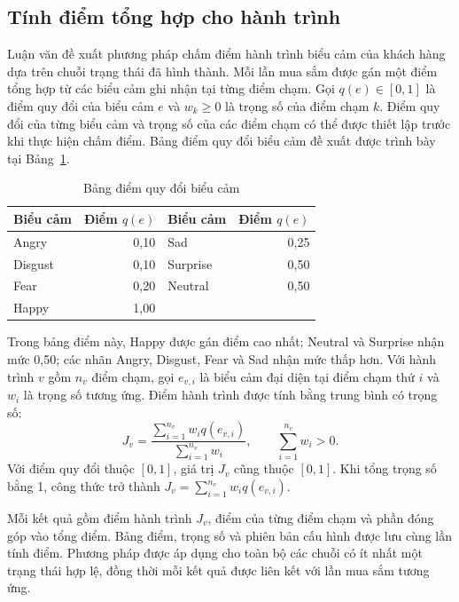 \documentclass[../LuanVan.tex]{subfiles}
\begin{document}
\subsection{Tính điểm tổng hợp cho hành trình}
\label{subsection:3.4.journey_scoring}

Luận văn đề xuất phương pháp chấm điểm hành trình biểu cảm của khách hàng dựa trên chuỗi trạng thái đã hình thành. Mỗi lần mua sắm được gán một điểm tổng hợp từ các biểu cảm ghi nhận tại từng điểm chạm. Gọi $q(e)\in[0,1]$ là điểm quy đổi của biểu cảm $e$ và $w_k\geq0$ là trọng số của điểm chạm $k$. Điểm quy đổi của từng biểu cảm và trọng số của các điểm chạm có thể được thiết lập trước khi thực hiện chấm điểm. Bảng điểm quy đổi biểu cảm đề xuất được trình bày tại Bảng~\ref{tab:journey_expression_values_ch3}.

\begin{table}[H]
    \centering
    \caption{Bảng điểm quy đổi biểu cảm}
    \label{tab:journey_expression_values_ch3}
    \begin{tabular}{|l|r|l|r|}
        \hline
        \textbf{Biểu cảm} & \textbf{Điểm $q(e)$} & \textbf{Biểu cảm} & \textbf{Điểm $q(e)$} \\
        \hline
        Angry & 0,10 & Sad & 0,25 \\
        \hline
        Disgust & 0,10 & Surprise & 0,50 \\
        \hline
        Fear & 0,20 & Neutral & 0,50 \\
        \hline
        Happy & 1,00 & & \\
        \hline
    \end{tabular}
\end{table}

Trong bảng điểm này, Happy được gán điểm cao nhất; Neutral và Surprise nhận mức 0,50; các nhãn Angry, Disgust, Fear và Sad nhận mức thấp hơn. Với hành trình $v$ gồm $n_v$ điểm chạm, gọi $e_{v,i}$ là biểu cảm đại diện tại điểm chạm thứ $i$ và $w_i$ là trọng số tương ứng. Điểm hành trình được tính bằng trung bình có trọng số:
\begin{equation}
    J_v=\frac{\displaystyle\sum_{i=1}^{n_v}w_iq(e_{v,i})}
    {\displaystyle\sum_{i=1}^{n_v}w_i},\qquad
    \sum_{i=1}^{n_v}w_i>0.
    \label{eq:ch3_journey_score}
\end{equation}
Với điểm quy đổi thuộc $[0,1]$, giá trị $J_v$ cũng thuộc $[0,1]$. Khi tổng trọng số bằng 1, công thức trở thành $J_v=\sum_{i=1}^{n_v}w_iq(e_{v,i})$.

Mỗi kết quả gồm điểm hành trình $J_v$, điểm của từng điểm chạm và phần đóng góp vào tổng điểm. Bảng điểm, trọng số và phiên bản cấu hình được lưu cùng lần tính điểm. Phương pháp được áp dụng cho toàn bộ các chuỗi có ít nhất một trạng thái hợp lệ, đồng thời mỗi kết quả được liên kết với lần mua sắm tương ứng.
\end{document}
